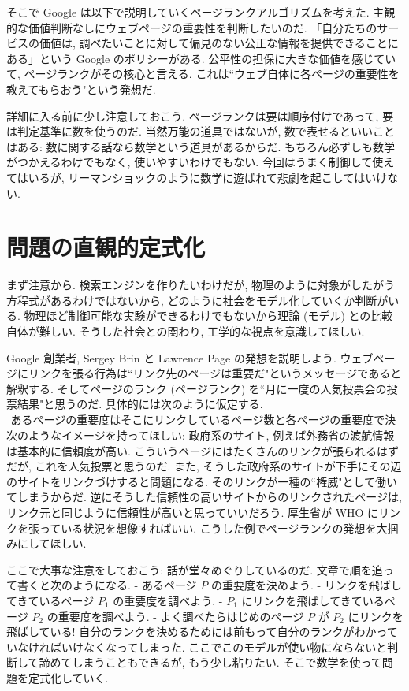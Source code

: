 \documentclass[openany, a4paper, oneside]{jsbook}
\begin{document}
そこで Google は以下で説明していくページランクアルゴリズムを考えた.
主観的な価値判断なしにウェブページの重要性を判断したいのだ.
「自分たちのサービスの価値は, 調べたいことに対して偏見のない公正な情報を提供できることにある」という Google のポリシーがある.
公平性の担保に大きな価値を感じていて, ページランクがその核心と言える.
これは``ウェブ自体に各ページの重要性を教えてもらおう"という発想だ.

\begin{rem}
詳細に入る前に少し注意しておこう.
ページランクは要は順序付けであって, 要は判定基準に数を使うのだ.
当然万能の道具ではないが, 数で表せるといいことはある:
数に関する話なら数学という道具があるからだ.
もちろん必ずしも数学がつかえるわけでもなく, 使いやすいわけでもない.
今回はうまく制御して使えてはいるが,
リーマンショックのように数学に遊ばれて悲劇を起こしてはいけない.
\end{rem}
\section{問題の直観的定式化}

まず注意から.
検索エンジンを作りたいわけだが, 物理のように対象がしたがう方程式があるわけではないから,
どのように社会をモデル化していくか判断がいる.
物理ほど制御可能な実験ができるわけでもないから理論 (モデル) との比較自体が難しい.
そうした社会との関わり, 工学的な視点を意識してほしい.

Google 創業者, Sergey Brin と Lawrence Page の発想を説明しよう.
ウェブページにリンクを張る行為は``リンク先のページは重要だ"というメッセージであると解釈する.
そしてページのランク (ページランク) を``月に一度の人気投票会の投票結果"と思うのだ.
具体的には次のように仮定する.
\begin{align}
\text{あるページの重要度はそこにリンクしているページ数と各ページの重要度で決まる.}
\end{align}
次のようなイメージを持ってほしい:
政府系のサイト, 例えば外務省の渡航情報は基本的に信頼度が高い.
こういうページにはたくさんのリンクが張られるはずだが, これを人気投票と思うのだ.
また, そうした政府系のサイトが下手にその辺のサイトをリンクづけすると問題になる.
そのリンクが一種の``権威"として働いてしまうからだ.
逆にそうした信頼性の高いサイトからのリンクされたページは,
リンク元と同じように信頼性が高いと思っていいだろう.
厚生省が WHO にリンクを張っている状況を想像すればいい.
こうした例でページランクの発想を大掴みにしてほしい.

\begin{rem}
ここで大事な注意をしておこう: 話が堂々めぐりしているのだ.
文章で順を追って書くと次のようになる.
- あるページ $P$ の重要度を決めよう.
- リンクを飛ばしてきているページ $P_1$ の重要度を調べよう.
- $P_1$ にリンクを飛ばしてきているページ $P_2$ の重要度を調べよう.
- よく調べたらはじめのページ $P$ が $P_2$ にリンクを飛ばしている!
自分のランクを決めるためには前もって自分のランクがわかっていなければいけなくなってしまった.
ここでこのモデルが使い物にならないと判断して諦めてしまうこともできるが, もう少し粘りたい.
そこで数学を使って問題を定式化していく.
\end{rem}
\end{document}
